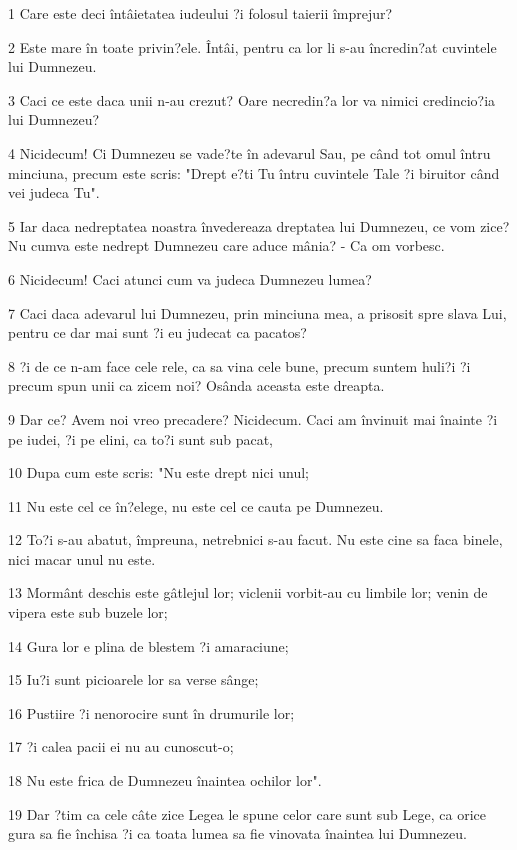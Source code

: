 \par 1 Care este deci întâietatea iudeului ?i folosul taierii împrejur?
\par 2 Este mare în toate privin?ele. Întâi, pentru ca lor li s-au încredin?at cuvintele lui Dumnezeu.
\par 3 Caci ce este daca unii n-au crezut? Oare necredin?a lor va nimici credincio?ia lui Dumnezeu?
\par 4 Nicidecum! Ci Dumnezeu se vade?te în adevarul Sau, pe când tot omul întru minciuna, precum este scris: "Drept e?ti Tu întru cuvintele Tale ?i biruitor când vei judeca Tu".
\par 5 Iar daca nedreptatea noastra învedereaza dreptatea lui Dumnezeu, ce vom zice? Nu cumva este nedrept Dumnezeu care aduce mânia? - Ca om vorbesc.
\par 6 Nicidecum! Caci atunci cum va judeca Dumnezeu lumea?
\par 7 Caci daca adevarul lui Dumnezeu, prin minciuna mea, a prisosit spre slava Lui, pentru ce dar mai sunt ?i eu judecat ca pacatos?
\par 8 ?i de ce n-am face cele rele, ca sa vina cele bune, precum suntem huli?i ?i precum spun unii ca zicem noi? Osânda aceasta este dreapta.
\par 9 Dar ce? Avem noi vreo precadere? Nicidecum. Caci am învinuit mai înainte ?i pe iudei, ?i pe elini, ca to?i sunt sub pacat,
\par 10 Dupa cum este scris: "Nu este drept nici unul;
\par 11 Nu este cel ce în?elege, nu este cel ce cauta pe Dumnezeu.
\par 12 To?i s-au abatut, împreuna, netrebnici s-au facut. Nu este cine sa faca binele, nici macar unul nu este.
\par 13 Mormânt deschis este gâtlejul lor; viclenii vorbit-au cu limbile lor; venin de vipera este sub buzele lor;
\par 14 Gura lor e plina de blestem ?i amaraciune;
\par 15 Iu?i sunt picioarele lor sa verse sânge;
\par 16 Pustiire ?i nenorocire sunt în drumurile lor;
\par 17 ?i calea pacii ei nu au cunoscut-o;
\par 18 Nu este frica de Dumnezeu înaintea ochilor lor".
\par 19 Dar ?tim ca cele câte zice Legea le spune celor care sunt sub Lege, ca orice gura sa fie închisa ?i ca toata lumea sa fie vinovata înaintea lui Dumnezeu.
